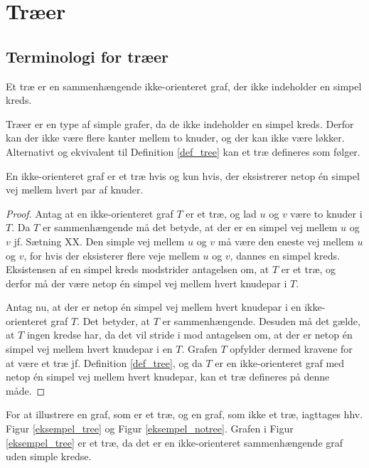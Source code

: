 \section{Træer}
\subsection{Terminologi for træer}

\begin{defn}
Et træ er en sammenhængende ikke-orienteret graf, der ikke indeholder en simpel kreds.
\label{def_tree}
\end{defn}

\noindent Træer er en type af simple grafer, da de ikke indeholder en simpel kreds. Derfor kan der ikke være flere kanter mellem to knuder, og der kan ikke være løkker. Alternativt og ekvivalent til Definition \ref{def_tree} kan et træ defineres som følger.

\begin{thm}
En ikke-orienteret graf er et træ hvis og kun hvis, der eksistrerer netop én simpel vej mellem hvert par af knuder. 
\end{thm}

\begin{proof}
Antag at en ikke-orienteret graf $T$ er et træ, og lad $u$ og $v$ være to knuder i $T$. Da $T$ er sammenhængende må det betyde, at der er en simpel vej mellem $u$ og $v$ jf. Sætning XX. Den simple vej mellem $u$ og $v$ må være den eneste vej mellem $u$ og $v$, for hvis der eksisterer flere veje mellem $u$ og $v$, dannes en simpel kreds. Eksistensen af en simpel kreds modstrider antagelsen om, at $T$ er et træ, og derfor må der være netop én simpel vej mellem hvert knudepar i $T$.

Antag nu, at der er netop én simpel vej mellem hvert knudepar i en ikke-orienteret graf $T$. Det betyder, at $T$ er sammenhængende. Desuden må det gælde, at $T$ ingen kredse har, da det vil stride i mod antagelsen om, at der er netop én simpel vej mellem hvert knudepar i en $T$. Grafen $T$ opfylder dermed kravene for at være et træ jf. Definition \ref{def_tree}, og da $T$ er en ikke-orienteret graf med netop én simpel vej mellem hvert knudepar, kan et træ defineres på denne måde.
\end{proof}

\begin{exmp}
For at illustrere en graf, som er et træ, og en graf, som ikke et træ, iagttages hhv. Figur \ref{eksempel_tree} og Figur \ref{eksempel_notree}. Grafen i Figur \ref{eksempel_tree} er et træ, da det er en ikke-orienteret sammenhængende graf uden simple kredse.
\end{exmp}

